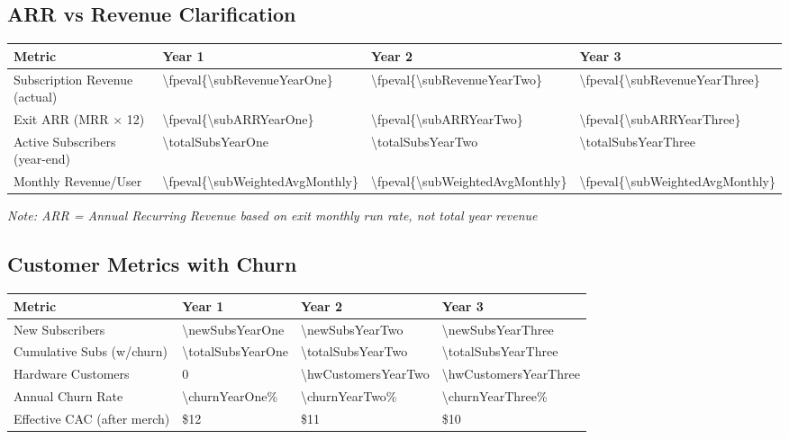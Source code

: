 \documentclass[11pt]{article}
\newcommand{\numfpeval}[1]{\num{\fpeval{#1}}}
\begin{document}
\subsection{ARR vs Revenue Clarification}
\begin{table}[H]
\centering
\begin{tabularx}{\linewidth}{l Y Y Y}
\toprule
Metric & Year 1 & Year 2 & Year 3 \\\midrule
Subscription Revenue (actual) & \numfpeval{\subRevenueYearOne} & \numfpeval{\subRevenueYearTwo} & \numfpeval{\subRevenueYearThree} \\
Exit ARR (MRR $\times$ 12) & \numfpeval{\subARRYearOne} & \numfpeval{\subARRYearTwo} & \numfpeval{\subARRYearThree} \\
Active Subscribers (year-end) & \num{\totalSubsYearOne} & \num{\totalSubsYearTwo} & \num{\totalSubsYearThree} \\
Monthly Revenue/User & \numfpeval{\subWeightedAvgMonthly} & \numfpeval{\subWeightedAvgMonthly} & \numfpeval{\subWeightedAvgMonthly} \\
\bottomrule
\end{tabularx}
\end{table}
\textit{Note: ARR = Annual Recurring Revenue based on exit monthly run rate, not total year revenue}

\subsection{Customer Metrics with Churn}
\begin{table}[H]
\centering
\begin{tabularx}{\linewidth}{l Y Y Y}
\toprule
Metric & Year 1 & Year 2 & Year 3 \\\midrule
New Subscribers & \num{\newSubsYearOne} & \num{\newSubsYearTwo} & \num{\newSubsYearThree} \\
Cumulative Subs (w/churn) & \num{\totalSubsYearOne} & \num{\totalSubsYearTwo} & \num{\totalSubsYearThree} \\
Hardware Customers & \num{0} & \num{\hwCustomersYearTwo} & \num{\hwCustomersYearThree} \\
Annual Churn Rate\cite{recurly2024} & \num{\churnYearOne}\% & \num{\churnYearTwo}\% & \num{\churnYearThree}\% \\
Effective CAC (after merch) & \$\num{12} & \$\num{11} & \$\num{10} \\
\bottomrule
\end{tabularx}
\end{table}
\end{document}

